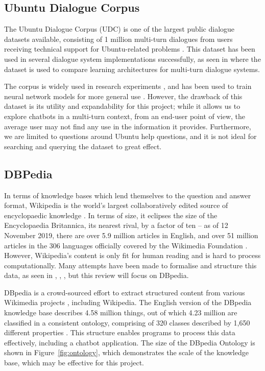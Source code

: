 \subsection{Ubuntu Dialogue Corpus}
The Ubuntu Dialogue Corpus (UDC) is one of the largest public dialogue datasets available, consisting of 1 million multi-turn dialogues from users receiving technical support for Ubuntu-related problems \cite{lowe2015ubuntu}. This dataset has been used in several dialogue system implementations successfully, as seen in \cite{lowe2015ubuntu} where the dataset is used to compare learning architectures for multi-turn dialogue systems. 


The corpus is widely used in research experiments \cite{kadlec2015improved}, and has been used to train neural network models for more general use \cite{lowe2017training}. However, the drawback of this dataset is its utility and expandability for this project; while it allows us to explore chatbots in a multi-turn context, from an end-user point of view, the average user may not find any use in the information it provides. Furthermore, we are limited to questions around Ubuntu help questions, and it is not ideal for searching and querying the dataset to great effect. 


\subsection{DBPedia}
In terms of knowledge bases which lend themselves to the question and answer format, Wikipedia is the world’s largest collaboratively edited source of encyclopaedic knowledge \cite{volkel2006semantic}. In terms of size, it eclipses the size of the Encyclopaedia Britannica, its nearest rival, by a factor of ten \cite{medelyan2009mining} -- as of 12 November 2019, there are over 5.9 million articles in English, and over 51 million articles in the 306 languages officially covered by the Wikimedia Foundation \cite{wikimedia2019}. However, Wikipedia’s content is only fit for human reading \cite{volkel2006semantic} and is hard to process computationally. Many attempts have been made to formalise and structure this data, as seen in \cite{volkel2006semantic}, \cite{medelyan2009mining}, \cite{wu2007autonomously}, but this review will focus on DBpedia.

DBpedia is a crowd-sourced effort to extract structured content from various Wikimedia projects \cite{dbpedia2019about}, including Wikipedia. The English version of the DBpedia knowledge base describes 4.58 million things, out of which 4.23 million are classified in a consistent ontology, comprising of 320 classes described by 1,650 different properties \cite{dbpedia2019ontology}. This structure enables programs to process this data effectively, including a chatbot application. The size of the DBpedia Ontology is shown in Figure~\ref{fig:ontology}, which demonstrates the scale of the knowledge base, which may be effective for this project.

